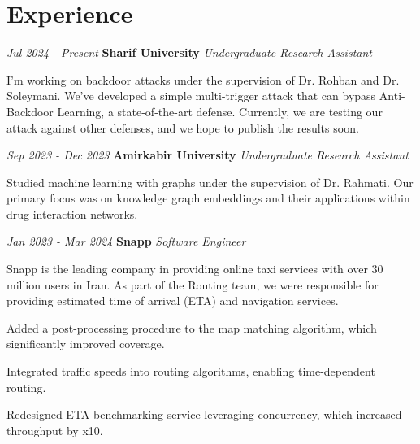 \section{Experience}


\begin{twocolentry}
	{\textit{Jul 2024 - Present}}
	\textbf{Sharif University}
	\textit{Undergraduate Research Assistant}
\end{twocolentry}

\begin{onecolentry}
	I'm working on backdoor attacks under the supervision of Dr. Rohban and Dr. Soleymani. We've developed a simple multi-trigger attack that can bypass Anti-Backdoor Learning, a state-of-the-art defense. Currently, we are testing our attack against other defenses, and we hope to publish the results soon. 
\end{onecolentry}

\vspace{0.20cm}

\begin{twocolentry}
	{\textit{Sep 2023 - Dec 2023}}
	\textbf{Amirkabir University}
	\textit{Undergraduate Research Assistant}
\end{twocolentry}


\begin{onecolentry}
	Studied machine learning with graphs under the supervision of Dr. Rahmati. Our primary focus was on knowledge graph embeddings and their applications within drug interaction networks. 
\end{onecolentry}

\vspace{0.20cm}

\begin{twocolentry}
	{\textit{Jan 2023 - Mar 2024}}
	\textbf{Snapp}
	\textit{Software Engineer}
\end{twocolentry}


\begin{onecolentry}
	Snapp is the leading company in providing online taxi services with over 30 million users in Iran. As part of the Routing team, we were responsible for providing estimated time of arrival (ETA) and navigation services. 
	
	\begin{highlights}
		\item Added a post-processing procedure to the map matching algorithm, which significantly improved coverage.
		\item Integrated traffic speeds into routing algorithms, enabling time-dependent routing. 
		\item Redesigned ETA benchmarking service leveraging concurrency, which increased  throughput by x10.
		
	\end{highlights}
	
\end{onecolentry}

